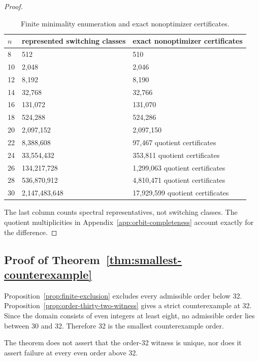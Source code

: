 \begin{proof}
\begin{table}[tbp]
\centering
\caption{Finite minimality enumeration and exact nonoptimizer certificates.}
\label{tab:minimality-counts}
\begingroup
\renewcommand{\arraystretch}{1.12}
\begin{tabular}{lll}
\toprule
\(n\) & represented switching classes & exact nonoptimizer certificates \\
\midrule
8 & 512 & 510 \\
10 & 2,048 & 2,046 \\
12 & 8,192 & 8,190 \\
14 & 32,768 & 32,766 \\
16 & 131,072 & 131,070 \\
18 & 524,288 & 524,286 \\
20 & 2,097,152 & 2,097,150 \\
22 & 8,388,608 & 97,467 quotient certificates \\
24 & 33,554,432 & 353,811 quotient certificates \\
26 & 134,217,728 & 1,299,063 quotient certificates \\
28 & 536,870,912 & 4,810,471 quotient certificates \\
30 & 2,147,483,648 & 17,929,599 quotient certificates \\
\bottomrule
\end{tabular}
\endgroup
\end{table}

The last column counts spectral representatives, not switching classes. The
quotient multiplicities in Appendix~\ref{app:orbit-completeness} account exactly for the difference.

\end{proof}
\subsection{Proof of Theorem~\ref{thm:smallest-counterexample}}

Proposition~\ref{prop:finite-exclusion} excludes every admissible order below 32. Proposition~\ref{prop:order-thirty-two-witness}
gives a strict counterexample at 32. Since the domain consists of even integers
at least eight, no admissible order lies between 30 and 32. Therefore 32 is the
smallest counterexample order.

The theorem does not assert that the order-32 witness is unique, nor does it
assert failure at every even order above 32.
